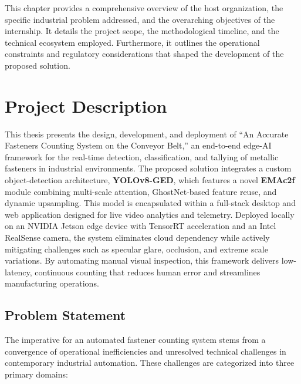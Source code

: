 \label{ch:introduction}

This chapter provides a comprehensive overview of the host organization, the specific industrial problem addressed, and the overarching objectives of the internship. It details the project scope, the methodological timeline, and the technical ecosystem employed. Furthermore, it outlines the operational constraints and regulatory considerations that shaped the development of the proposed solution.

\section{Project Description} 
\label{sec:project_description}

This thesis presents the design, development, and deployment of ``An Accurate Fasteners Counting System on the Conveyor Belt,'' an end-to-end edge-AI framework for the real-time detection, classification, and tallying of metallic fasteners in industrial environments. The proposed solution integrates a custom object-detection architecture, \textbf{YOLOv8-GED}, which features a novel \textbf{EMAc2f} module combining multi-scale attention, GhostNet-based feature reuse, and dynamic upsampling. This model is encapsulated within a full-stack desktop and web application designed for live video analytics and telemetry. Deployed locally on an NVIDIA Jetson edge device with TensorRT acceleration and an Intel RealSense camera, the system eliminates cloud dependency while actively mitigating challenges such as specular glare, occlusion, and extreme scale variations. By automating manual visual inspection, this framework delivers low-latency, continuous counting that reduces human error and streamlines manufacturing operations.

\subsection{Problem Statement}
\label{sec:problem_statement}

The imperative for an automated fastener counting system stems from a convergence of operational inefficiencies and unresolved technical challenges in contemporary industrial automation. These challenges are categorized into three primary domains:

